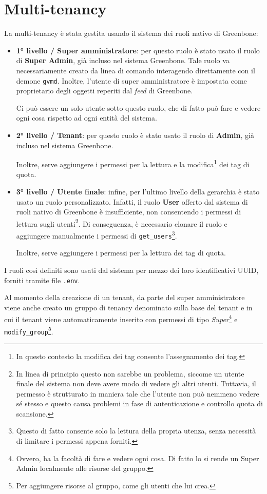 \section{Multi-tenancy}
La multi-tenancy è stata gestita usando il sistema dei ruoli nativo di Greenbone:
\begin{itemize}
    \item \textbf{1° livello / Super amministratore}: per questo ruolo è stato usato il ruolo di \textbf{Super Admin}, già incluso nel sistema Greenbone. Tale ruolo va necessariamente creato da linea di comando interagendo direttamente con il demone \texttt{gvmd}. Inoltre, l'utente di super amministratore è impostata come proprietario degli oggetti reperiti dal \emph{feed} di Greenbone.

    Ci può essere un solo utente sotto questo ruolo, che di fatto può fare e vedere ogni cosa rispetto ad ogni entità del sistema.
    \item \textbf{2° livello / Tenant}: per questo ruolo è stato usato il ruolo di \textbf{Admin}, già incluso nel sistema Greenbone.

    Inoltre, serve aggiungere i permessi per la lettura e la modifica\footnote{In questo contesto la modifica dei tag consente l'assegnamento dei tag.} dei tag di quota.
    \item \textbf{3° livello / Utente finale}: infine, per l'ultimo livello della gerarchia è stato usato un ruolo personalizzato. Infatti, il ruolo \textbf{User} offerto dal sistema di ruoli nativo di Greenbone è insufficiente, non consentendo i permessi di lettura sugli utenti\footnote{In linea di principio questo non sarebbe un problema, siccome un utente finale del sistema non deve avere modo di vedere gli altri utenti. Tuttavia, il permesso è strutturato in maniera tale che l'utente non può nemmeno vedere sé stesso e questo causa problemi in fase di autenticazione e controllo quota di scansione.}. Di conseguenza, è necessario clonare il ruolo e aggiungere manualmente i permessi di \texttt{get\_users}\footnote{Questo di fatto consente solo la lettura della propria utenza, senza necessità di limitare i permessi appena forniti.}.

    Inoltre, serve aggiungere i permessi per la lettura dei tag di quota.
\end{itemize}
I ruoli così definiti sono usati dal sistema per mezzo dei loro identificativi UUID, forniti tramite file \texttt{.env}.

Al momento della creazione di un tenant, da parte del super amministratore viene anche creato un gruppo di tenancy denominato sulla base del tenant e in cui il tenant viene automaticamente inserito con permessi di tipo \emph{Super}\footnote{Ovvero, ha la facoltà di fare e vedere ogni cosa. Di fatto lo si rende un Super Admin localmente alle risorse del gruppo.} e \texttt{modify\_group}\footnote{Per aggiungere risorse al gruppo, come gli utenti che lui crea.}.
    
